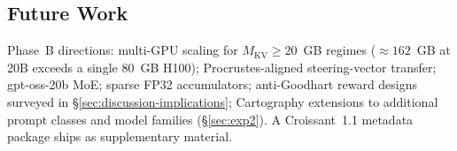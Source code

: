 \subsection{Future Work}\label{sec:future-work}

Phase~B directions: multi-GPU scaling for $M_{\text{KV}} \ge 20$~GB regimes ($\approx 162$~GB at 20B exceeds a single 80~GB H100); Procrustes-aligned steering-vector transfer; gpt-oss-20b MoE; sparse FP32 accumulators; anti-Goodhart reward designs surveyed in §\ref{sec:discussion-implications}; Cartography extensions to additional prompt classes and model families (§\ref{sec:exp2}). A Croissant~1.1 metadata package ships as supplementary material.


